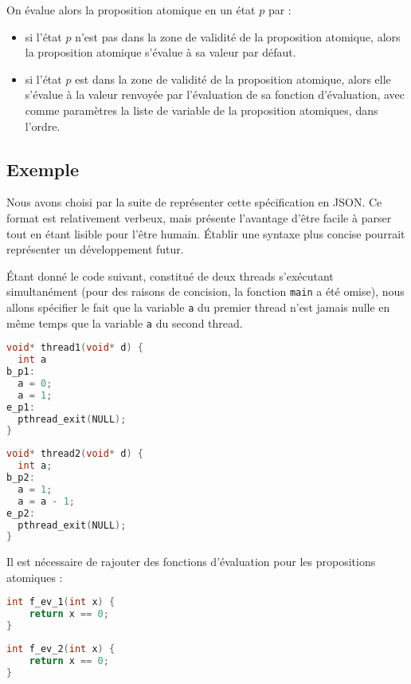 On évalue alors la proposition atomique en un état \(p\) par :

\begin{itemize}
\item
  si l'état \(p\) n'est pas dans la zone de validité de la proposition
  atomique, alors la proposition atomique s'évalue à sa valeur par
  défaut.
\item
  si l'état \(p\) est dans la zone de validité de la proposition
  atomique, alors elle s'évalue à la valeur renvoyée par l'évaluation de
  sa fonction d'évaluation, avec comme paramètres la liste de variable
  de la proposition atomiques, dans l'ordre.
\end{itemize}

\subsection{Exemple}

Nous avons choisi par la suite de représenter cette spécification en
\ac{JSON}\cite{json}. Ce format est
relativement verbeux, mais présente l'avantage d'être facile à parser
tout en étant lisible pour l'être humain. Établir une syntaxe plus
concise pourrait représenter un développement futur.

Étant donné le code suivant, constitué de deux threads s'exécutant
simultanément (pour des raisons de concision, la fonction
\texttt{main} a été omise), nous allons spécifier le fait que la
variable \texttt{a} du premier thread n'est jamais nulle en même temps que
la variable \texttt{a} du second thread.

\noindent\begin{minipage}{.45\textwidth}
\begin{lstlisting}[language=C, frame=single, caption=Thread 1]
void* thread1(void* d) {
  int a
b_p1:
  a = 0;
  a = 1;
e_p1:
  pthread_exit(NULL);
}
\end{lstlisting}
\end{minipage}\hfill
\begin{minipage}{.45\textwidth}
\begin{lstlisting}[language=C, frame=single, caption=Thread 2]
void* thread2(void* d) {
  int a;
b_p2:
  a = 1;
  a = a - 1;
e_p2:
  pthread_exit(NULL);
}
\end{lstlisting}
\end{minipage}

Il est nécessaire de rajouter des fonctions d'évaluation pour les
propositions atomiques :

\noindent\begin{minipage}{.45\textwidth}
\begin{lstlisting}[language=C, frame=single, caption=Proposition atomique p1]
int f_ev_1(int x) {
    return x == 0;
}
\end{lstlisting}
\end{minipage}\hfill
\begin{minipage}{.45\textwidth}
\begin{lstlisting}[language=C, frame=single, caption=Proposition atomique p2]
int f_ev_2(int x) {
    return x == 0;
}
\end{lstlisting}
\end{minipage}

